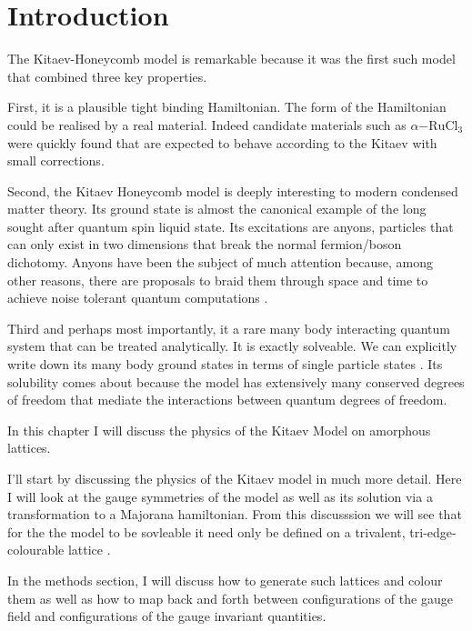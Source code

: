 \hypertarget{introduction}{%
\section{Introduction}\label{introduction}}

The Kitaev-Honeycomb model is remarkable because it was the first such
model that combined three key properties.

First, it is a plausible tight binding Hamiltonian. The form of the
Hamiltonian could be realised by a real material. Indeed candidate
materials such as \(\alpha\mathrm{-RuCl}_3\) were quickly found
\autocite{banerjeeProximateKitaevQuantum2016,trebstKitaevMaterials2022}
that are expected to behave according to the Kitaev with small
corrections.

Second, the Kitaev Honeycomb model is deeply interesting to modern
condensed matter theory. Its ground state is almost the canonical
example of the long sought after quantum spin liquid state. Its
excitations are anyons, particles that can only exist in two dimensions
that break the normal fermion/boson dichotomy. Anyons have been the
subject of much attention because, among other reasons, there are
proposals to braid them through space and time to achieve noise tolerant
quantum computations
\textcite{freedmanTopologicalQuantumComputation2003}.

Third and perhaps most importantly, it a rare many body interacting
quantum system that can be treated analytically. It is exactly
solveable. We can explicitly write down its many body ground states in
terms of single particle states
\textcite{kitaevAnyonsExactlySolved2006}. Its solubility comes about
because the model has extensively many conserved degrees of freedom that
mediate the interactions between quantum degrees of freedom.

In this chapter I will discuss the physics of the Kitaev Model on
amorphous lattices.

I'll start by discussing the physics of the Kitaev model in much more
detail. Here I will look at the gauge symmetries of the model as well as
its solution via a transformation to a Majorana hamiltonian. From this
discusssion we will see that for the the model to be sovleable it need
only be defined on a trivalent, tri-edge-colourable lattice
\autocite{Nussinov2009}.

In the methods section, I will discuss how to generate such lattices and
colour them as well as how to map back and forth between configurations
of the gauge field and configurations of the gauge invariant quantities.


